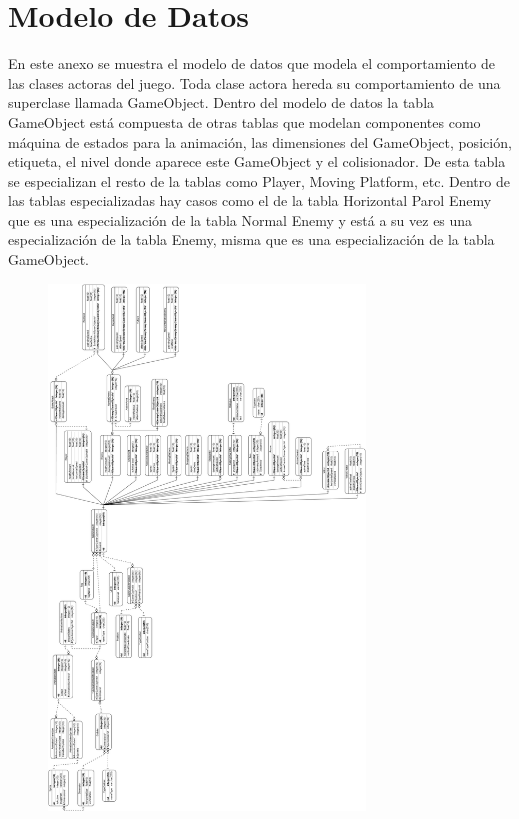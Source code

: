\chapter{Modelo de Datos} \label{Anexo:ModeloDatos}
En este anexo se muestra el modelo de datos que modela el comportamiento de las clases actoras del juego. Toda clase actora hereda su comportamiento de una superclase llamada GameObject. Dentro del modelo de datos la tabla GameObject está compuesta de otras tablas que modelan componentes como máquina de estados para la animación, las dimensiones del GameObject, posición, etiqueta, el nivel donde aparece este GameObject y el colisionador. De esta tabla se especializan el resto de la tablas como Player, Moving Platform, etc. Dentro de las tablas especializadas hay casos como el de la tabla Horizontal Parol Enemy que es una especialización de la  tabla  Normal Enemy y está a su vez es una especialización de la tabla Enemy, misma que es una especialización de la tabla GameObject.
\begin{figure}[H]
    \centering
    \includegraphics[width=0.75\textwidth]{Anexos/ModeloDatos/Yolotl02.png}
\end{figure}